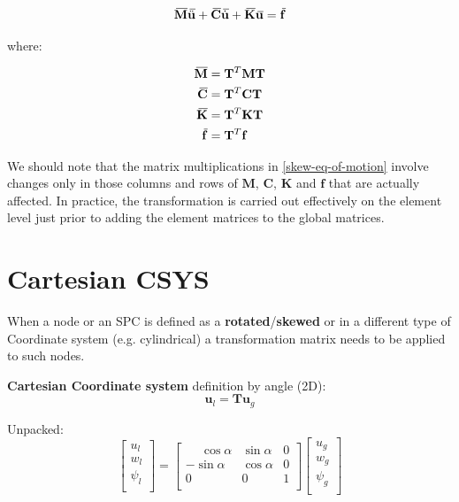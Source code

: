 \documentclass[10pt,b5paper,titlepage]{book}
\newcommand{\m}{\mathbf}
\newcommand{\closure}[2][3]{%
{}\mkern#1mu\overline{\mkern-#1mu#2}}
\newenvironment{eqarray}
{
    \begin{eqnarray}
        \begin{aligned}
}
{
        \end{aligned}
    \end{eqnarray}
}
\begin{document}
\begin{equation}
    \closure{\m{M}} \closure{\ddot{\m{u}}}
    + \closure{\m{C}} \closure{\dot{\m{u}}}
    + \closure{\m{K}} \closure{\m{u}}
    = \closure{\m{f}}
\end{equation}

where:

\begin{eqarray}\label{skew-eq-of-motion}
    \closure{\m{M}} & = \m{T}^T \m{M} \m{T} \\
    \closure{\m{C}} & = \m{T}^T \m{C} \m{T} \\
    \closure{\m{K}} & = \m{T}^T \m{K} \m{T} \\
    \closure{\m{f}} & = \m{T}^T \m{f}
\end{eqarray}

We should note that the matrix multiplications in \eqref{skew-eq-of-motion}
involve changes only in those columns and rows of $ \m{M} $, $ \m{C} $,
$ \m{K} $ and $ \m{f} $ that are actually affected. In practice,
the transformation is carried out effectively on the element level just prior
to adding the element matrices to the global matrices.


\newpage
\section{Cartesian CSYS}

When a node or an SPC is defined as a \textbf{rotated}/\textbf{skewed} or in
a different type of Coordinate system (e.g. cylindrical) a transformation matrix
needs to be applied to such nodes.

\textbf{Cartesian Coordinate system} definition by angle (2D):
\begin{equation}
    \m{u}_l = \m{T} \m{u}_g
\end{equation}

Unpacked:
\begin{equation}
    \begin{bmatrix}
        u_l \\
        w_l \\
        \psi_l \\
    \end{bmatrix}
    = \begin{bmatrix}
        \phantom{-}\cos \alpha & \sin \alpha & 0 \\
        -\sin \alpha & \cos \alpha & 0 \\
        0 & 0 & 1 \\
    \end{bmatrix}
    \begin{bmatrix}
        u_g \\
        w_g \\
        \psi_g \\
    \end{bmatrix}
\end{equation}
\end{document}
